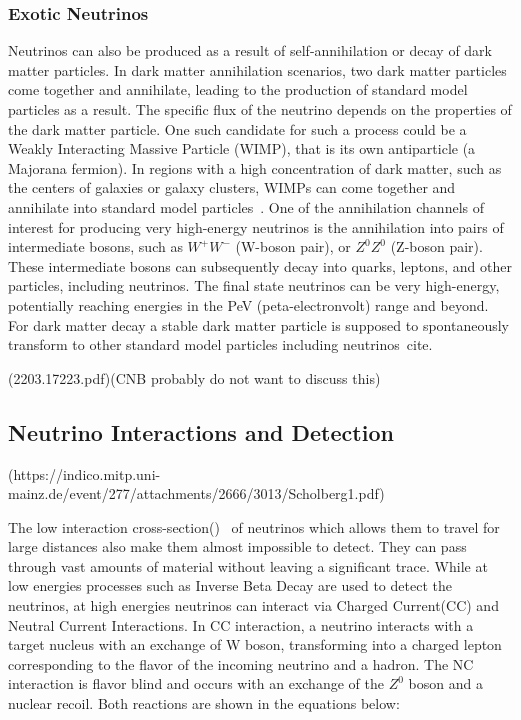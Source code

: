 \subsubsection*{Exotic Neutrinos}
\label{subsubsec:ExoticNu}

Neutrinos can also be produced as a result of self-annihilation or decay of dark matter particles. In dark matter annihilation scenarios, two dark matter particles come together and annihilate, leading to the production of standard model particles as a result. The specific flux of the neutrino depends on the properties of the dark matter particle. One such candidate for such a process could be a Weakly Interacting Massive Particle (WIMP), that is its own antiparticle (a Majorana fermion). In regions with a high concentration of dark matter, such as the centers of galaxies or galaxy clusters, WIMPs can come together and annihilate into standard model particles~\cite{}. One of the annihilation channels of interest for producing very high-energy neutrinos is the annihilation into pairs of intermediate bosons, such as $W^+W^-$ (W-boson pair), or $Z^0Z^0$ (Z-boson pair). These intermediate bosons can subsequently decay into quarks, leptons, and other particles, including neutrinos. The final state neutrinos can be very high-energy, potentially reaching energies in the PeV (peta-electronvolt) range and beyond. For dark matter decay a stable dark matter particle is supposed to spontaneously transform to other standard model particles including neutrinos~cite{}. 

(2203.17223.pdf)(CNB probably do not want to discuss this)


\subsection{Neutrino Interactions and Detection }(https://indico.mitp.uni-mainz.de/event/277/attachments/2666/3013/Scholberg1.pdf)
\label{subsec:Nuintdet}

The low interaction cross-section()~\cite{} of neutrinos which allows them to travel for large distances also make them almost impossible to detect. They can pass through vast amounts of material without leaving a significant trace. While at low energies processes such as Inverse Beta Decay are used to detect the neutrinos, at high energies neutrinos can interact via Charged Current(CC) and Neutral Current Interactions. In CC interaction, a neutrino interacts with a target nucleus with an exchange of W boson, transforming into a charged lepton corresponding to the flavor of the incoming neutrino and a hadron. The NC interaction is flavor blind and occurs with an exchange of the $Z^0$ boson and a nuclear recoil. Both reactions are shown in the equations below:

